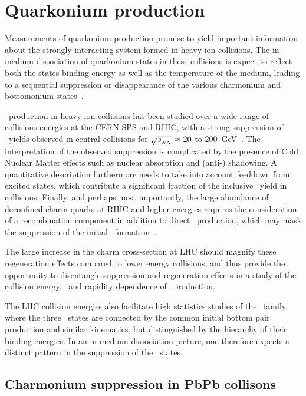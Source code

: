 \section{Quarkonium production}

Measurements of quarkonium production promise to yield important information about the 
strongly-interacting system formed in heavy-ion collisions.  The in-medium dissociation of quarkonium states
in these collisions is expect to reflect both the states binding energy as 
well as the temperature of the medium, leading to a sequential suppression or disappearance
of the various charmonium and bottomonium states~\cite{Matsui:1986dk,Digal:2001ue}.

\jpsi\ production in heavy-ion collisions has been studied over a wide range of 
collisions energies at the CERN SPS and RHIC, with a strong suppression of \jpsi\
yields observed in central collisions for $\sqrt{s_{_{NN}}} \approx 20$ to 
$200$~GeV~\cite{Alessandro:2004ap,Adare:2006ns,Adare:2011yf}.
The interpretation of the observed suppression is complicated by the presence 
of Cold Nuclear Matter effects such as nuclear absorption and (anti-) shadowing. A quantitative
description furthermore needs to take into account feeddown from excited states, 
which contribute a significant fraction of the inclusive \jpsi\ yield in \pp collisions.
Finally, and perhaps most importantly, the large abundance of deconfined charm quarks 
at RHIC and higher energies requires the consideration of a recombination component 
in addition to direct \jpsi\ production, which may mask the suppression of the initial 
\jpsi\ formation~\cite{BraunMunzinger:2000px,Thews:2000rj,Andronic:2007bi,Zhao:2007hh}.

The large increase in the charm cross-section at LHC should magnify these regeneration 
effects compared to lower energy collisions, and thus provide the opportunity to disentangle
suppression and regeneration effects in a study of the collision energy, 
\pT\ and rapidity dependence of \jpsi\ production. 

The LHC collision energies also facilitate high statistics studies of the \PgU\ family, where 
the three \PgUn\ states are connected by the common initial bottom pair production and 
similar kinematics, but distinguished by the hierarchy of their binding energies. In an 
in-medium dissociation picture, one therefore expects a distinct pattern in the suppression
of the \PgUn\ states.

\subsection{Charmonium suppression in PbPb collisons}

